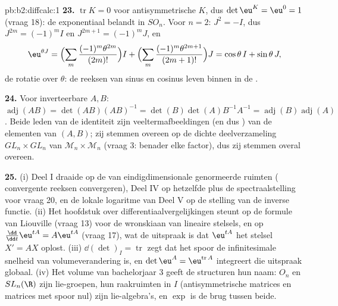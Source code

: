 \begin{solution}{pb:b2:diffcalc:1}
\textbf{23.} $\operatorname{tr}K = 0$ voor antisymmetrische $K$,
dus $\det\eu^K = \eu^0 = 1$ (vraag 18): de exponentiaal belandt in
$SO_n$. Voor $n = 2$: $J^2 = -I$, dus $J^{2m} = (-1)^mI$ en
$J^{2m+1} = (-1)^mJ$, en
\[
\eu^{\theta J}
= \Bigl(\sum_m\frac{(-1)^m\theta^{2m}}{(2m)!}\Bigr)I
+ \Bigl(\sum_m\frac{(-1)^m\theta^{2m+1}}{(2m+1)!}\Bigr)J
= \cos\theta\,I + \sin\theta\,J ,
\]
de rotatie over $\theta$: de reeksen van sinus en cosinus leven
binnen in de .

\textbf{24.} Voor inverteerbare $A, B$: $\operatorname{adj}(AB) =
\det(AB)(AB)^{-1} = \det(B)\det(A)B^{-1}A^{-1} =
\operatorname{adj}(B)\operatorname{adj}(A)$. Beide leden van de
identiteit zijn veeltermafbeeldingen (en dus ) van de
elementen van $(A, B)$; zij stemmen overeen op de dichte
deelverzameling $GL_n\times GL_n$ van $\mathcal M_n\times\mathcal
M_n$ (vraag 3: benader elke factor), dus zij stemmen overal
overeen.

\textbf{25.} (i) Deel I draaide op de  van
eindigdimensionale genormeerde ruimten ( convergente
reeksen convergeren), Deel IV op hetzelfde plus de
spectraalstelling voor vraag 20, en de lokale logaritme van Deel V
op de stelling van de inverse functie. (ii) Het hoofdstuk over
differentiaalvergelijkingen steunt op de formule van Liouville
(vraag 13) voor de wronskiaan van lineaire stelsels, en op
$\frac{\dd}{\dd t}\eu^{tA} = A\eu^{tA}$ (vraag 17), wat de uitspraak
is dat $\eu^{tA}$ het stelsel $X' = AX$ oplost. (iii) $\dd(\det)_I
= \operatorname{tr}$ zegt dat het spoor de infinitesimale snelheid
van volumeverandering is, en $\det\eu^A =
\eu^{\operatorname{tr}A}$ integreert die uitspraak globaal. (iv)
Het volume van bachelorjaar 3 geeft de structuren hun naam: $O_n$
en $SL_n(\R)$ zijn lie-groepen, hun raakruimten in $I$
(antisymmetrische matrices en matrices met spoor nul) zijn
lie-algebra's, en $\exp$ is de brug tussen beide.
\end{solution}
